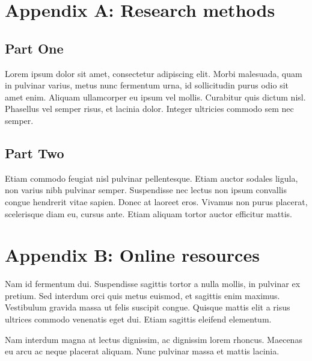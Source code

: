 \documentclass[sigconf,nonacm]{acmart}
\begin{document}


\clearpage
\appendix

\section{Appendix A: Research methods}

\subsection{Part One}

Lorem ipsum dolor sit amet, consectetur adipiscing elit. Morbi
malesuada, quam in pulvinar varius, metus nunc fermentum urna, id
sollicitudin purus odio sit amet enim. Aliquam ullamcorper eu ipsum
vel mollis. Curabitur quis dictum nisl. Phasellus vel semper risus, et
lacinia dolor. Integer ultricies commodo sem nec semper.

\subsection{Part Two}

Etiam commodo feugiat nisl pulvinar pellentesque. Etiam auctor sodales
ligula, non varius nibh pulvinar semper. Suspendisse nec lectus non
ipsum convallis congue hendrerit vitae sapien. Donec at laoreet
eros. Vivamus non purus placerat, scelerisque diam eu, cursus
ante. Etiam aliquam tortor auctor efficitur mattis.

\section{Appendix B: Online resources}

Nam id fermentum dui. Suspendisse sagittis tortor a nulla mollis, in
pulvinar ex pretium. Sed interdum orci quis metus euismod, et sagittis
enim maximus. Vestibulum gravida massa ut felis suscipit
congue. Quisque mattis elit a risus ultrices commodo venenatis eget
dui. Etiam sagittis eleifend elementum.

Nam interdum magna at lectus dignissim, ac dignissim lorem
rhoncus. Maecenas eu arcu ac neque placerat aliquam. Nunc pulvinar
massa et mattis lacinia.
\end{document}

